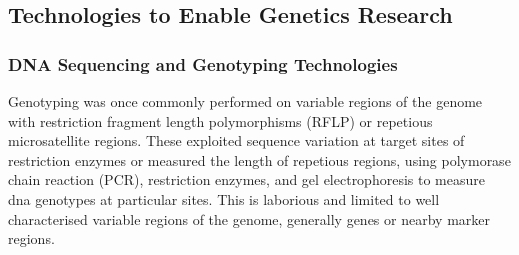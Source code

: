 

\subsection{Technologies to Enable Genetics Research}
\subsubsection{DNA Sequencing and Genotyping Technologies}
Genotyping was once commonly performed on variable regions of the genome with restriction fragment length polymorphisms (RFLP) or repetious microsatellite regions. These exploited sequence variation at target sites of restriction enzymes or measured the length of repetious regions, using polymorase chain reaction (PCR), restriction enzymes, and gel electrophoresis to measure \gls{dna} genotypes at particular sites. This is laborious and limited to well characterised variable regions of the genome, generally genes or nearby marker regions. 

